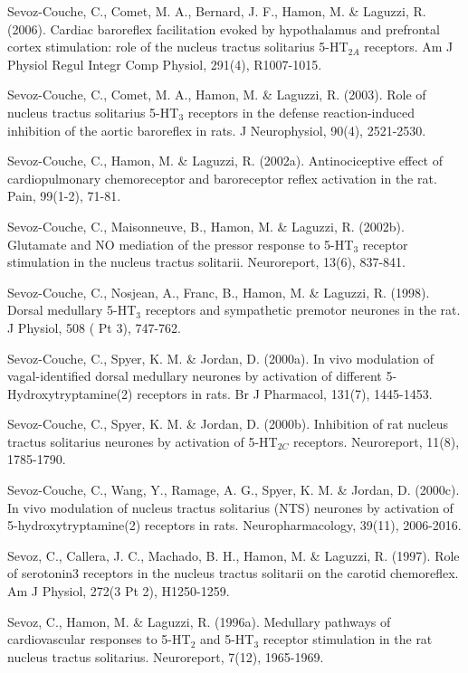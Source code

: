 \documentclass[a4paper,12pt,twoside]{report}
\begin{document}
\begin{singlespacing}
\begin{footnotesize}
Sevoz-Couche, C., Comet, M. A., Bernard, J. F., Hamon, M. \& Laguzzi, R. (2006). Cardiac baroreflex facilitation evoked by hypothalamus and prefrontal cortex stimulation: role of the nucleus tractus solitarius 5-HT$_{2A}$ receptors. Am J Physiol Regul Integr Comp Physiol, 291(4), R1007-1015.

Sevoz-Couche, C., Comet, M. A., Hamon, M. \& Laguzzi, R. (2003). Role of nucleus tractus solitarius 5-HT$_{3}$ receptors in the defense reaction-induced inhibition of the aortic baroreflex in rats. J Neurophysiol, 90(4), 2521-2530.

Sevoz-Couche, C., Hamon, M. \& Laguzzi, R. (2002a). Antinociceptive effect of cardiopulmonary chemoreceptor and baroreceptor reflex activation in the rat. Pain, 99(1-2), 71-81.

Sevoz-Couche, C., Maisonneuve, B., Hamon, M. \& Laguzzi, R. (2002b). Glutamate and NO mediation of the pressor response to 5-HT$_{3}$ receptor stimulation in the nucleus tractus solitarii. Neuroreport, 13(6), 837-841.

Sevoz-Couche, C., Nosjean, A., Franc, B., Hamon, M. \& Laguzzi, R. (1998). Dorsal medullary 5-HT$_{3}$ receptors and sympathetic premotor neurones in the rat. J Physiol, 508 ( Pt 3), 747-762.

Sevoz-Couche, C., Spyer, K. M. \& Jordan, D. (2000a). In vivo modulation of vagal-identified dorsal medullary neurones by activation of different 5-Hydroxy\linebreak tryptamine(2) receptors in rats. Br J Pharmacol, 131(7), 1445-1453.

Sevoz-Couche, C., Spyer, K. M. \& Jordan, D. (2000b). Inhibition of rat nucleus tractus solitarius neurones by activation of 5-HT$_{2C}$ receptors. Neuroreport, 11(8), 1785-1790.

Sevoz-Couche, C., Wang, Y., Ramage, A. G., Spyer, K. M. \& Jordan, D. (2000c). In vivo modulation of nucleus tractus solitarius (NTS) neurones by activation of 5-hydroxytryptamine(2) receptors in rats. Neuropharmacology, 39(11), 2006-2016.

Sevoz, C., Callera, J. C., Machado, B. H., Hamon, M. \& Laguzzi, R. (1997). Role of serotonin3 receptors in the nucleus tractus solitarii on the carotid chemoreflex. Am J Physiol, 272(3 Pt 2), H1250-1259.

Sevoz, C., Hamon, M. \& Laguzzi, R. (1996a). Medullary pathways of cardiovascular responses to 5-HT$_{2}$ and 5-HT$_{3}$ receptor stimulation in the rat nucleus tractus solitarius. Neuroreport, 7(12), 1965-1969.


\end{footnotesize}
\end{singlespacing}
\end{document}
